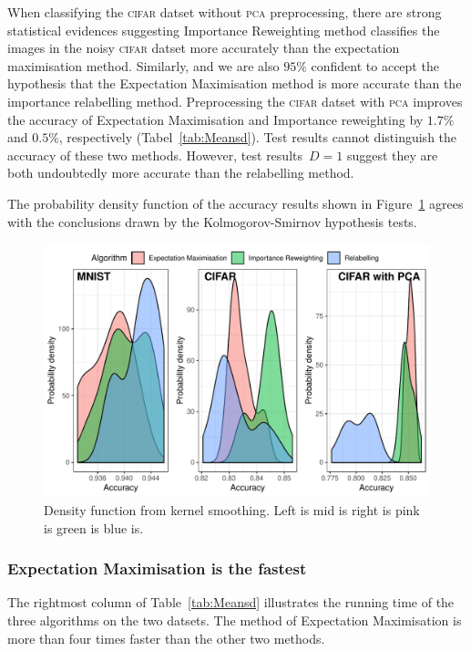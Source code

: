 \documentclass[12pt]{article} %
\begin{document}
When classifying the \textsc{cifar} datset without \textsc{pca} preprocessing, there are strong statistical evidences suggesting Importance Reweighting method classifies the images in the noisy \textsc{cifar} datset more accurately than the expectation maximisation method. Similarly, and we are also $95\%$ confident to accept the hypothesis that the Expectation Maximisation method is more accurate than the importance relabelling method. Preprocessing  the \textsc{cifar} datset with \textsc{pca} improves the accuracy of Expectation Maximisation and Importance reweighting by $1.7\%$ and $0.5\%$, respectively (Tabel~\ref{tab:Meansd}). Test results cannot distinguish the accuracy of these two methods. However, test results~$D=1$ suggest they are both undoubtedly more accurate than the relabelling method.

The probability density function of the accuracy results shown in Figure~\ref{fig:Density} agrees with the conclusions drawn by the Kolmogorov-Smirnov hypothesis tests.
\begin{figure}
    \centering
	\includegraphics[scale=0.8]{histo}
	\caption{Density function from kernel smoothing. Left is mid is right is pink is green is blue is.}
	\label{fig:Density}
\end{figure}


\subsubsection{Expectation Maximisation is the fastest}
The rightmost column of Table~\ref{tab:Meansd} illustrates the running time of the three algorithms on the two datsets.
The method of Expectation Maximisation is more than four times faster than the other two methods.
\end{document}
